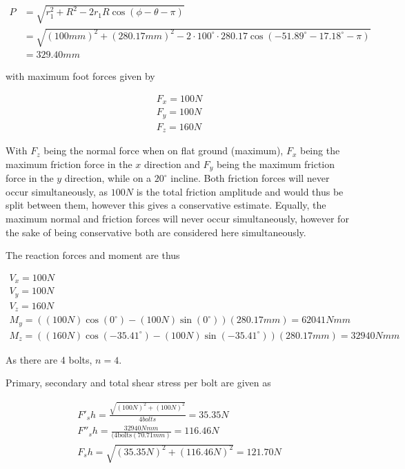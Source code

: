 \begin{equation}
    \begin{split}
        P   &= \sqrt{ r_1^2 + R^2 - 2 r_1 R \cos(\phi-\theta-\pi) } \\
            &= \sqrt{ (100mm)^2 + (280.17mm)^2 - 2\cdot 100^{\circ} \cdot 280.17 \cos(-51.89^{\circ} - 17.18^{\circ} - \pi)} \\
            &= 329.40 mm
    \end{split}
\end{equation}

with maximum foot forces given by

\begin{gather}
    F_x = 100N
    \\
    F_y = 100N
    \\
    F_z = 160N
\end{gather}{}

With $F_z$ being the normal force when on flat ground (maximum), $F_x$ being the maximum friction force in the $x$ direction and $F_y$ being the maximum friction force in the $y$ direction, while on a $20^{\circ}$ incline.
Both friction forces will never occur simultaneously, as $100N$ is the total friction amplitude and would thus be split between them, however this gives a conservative estimate.
Equally, the maximum normal and friction forces will never occur simultaneously, however for the sake of being conservative both are considered here simultaneously.

The reaction forces and moment are thus

\begin{gather}
    V_x = 100N
    \\
    V_y = 100N
    \\
    V_z =  160N
    \\
    M_y = ((100N)\cos(0^{\circ}) - (100N)\sin(0^{\circ}))(280.17mm) =  62041Nmm
    \\
    M_z = ((160N)\cos(-35.41^{\circ}) - (100N)\sin(-35.41^{\circ}))(280.17mm) = 32940Nmm
\end{gather}{}

As there are 4 bolts, $n=4$.

Primary, secondary and total shear stress per bolt are given as

\begin{gather}
    F'_sh = \frac{\sqrt{(100N)^2 + (100N)^2}}{4{bolts}} = 35.35N
    \\
    F''_sh = \frac{32940Nmm}{(4\text{bolts}(70.71mm)} = 116.46N
    \\
    F_sh = \sqrt{(35.35N)^2 + (116.46N)^2} = 121.70N
\end{gather}{}

